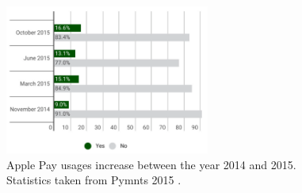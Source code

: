  \begin{figure}[H]
  \caption{Apple Pay usages increase between the year 2014 and 2015. Statistics taken from Pymnts 2015 \cite{apple-pay}.}
  \centering
  \label{fig:nfc}
    \includegraphics[width=0.6\textwidth]{nfc}
\end{figure}

